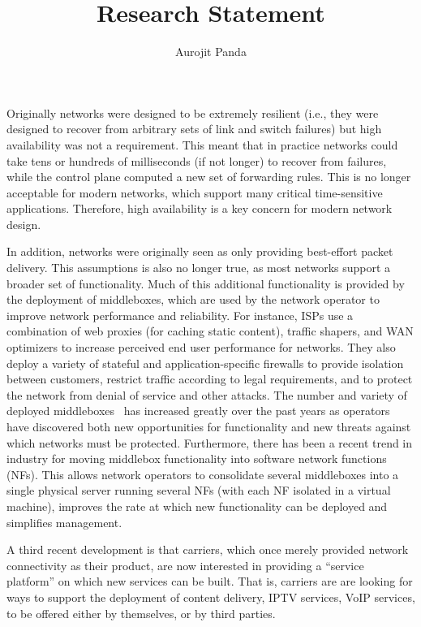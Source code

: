 \documentclass[letterpaper]{article}
\begin{document}
\title{\Large Research Statement}
\author{Aurojit Panda}
\date{}
\thispagestyle{empty}
\maketitle
Originally networks were designed to be extremely resilient (i.e., they were designed to recover from arbitrary sets of
link and switch failures) but high availability was not a requirement. This meant that in practice
networks could take tens or hundreds of milliseconds (if not longer) to recover from failures, while the control plane computed  a new
set of forwarding rules. This is no longer acceptable for modern networks, which support many critical time-sensitive
applications. Therefore, high availability is a key concern for modern network design.

In addition, networks were originally seen as only providing best-effort packet delivery. This assumptions is also no
longer true, as most networks support a broader set of functionality. Much of this additional functionality is provided by the deployment of middleboxes, which are
used by the network operator to improve network performance and reliability. For instance, ISPs use a combination of web
proxies (for caching static content), traffic shapers, and WAN optimizers to increase perceived end user performance for
networks. They also deploy a variety of stateful and application-specific firewalls to provide isolation between
customers, restrict traffic according to legal requirements, and to protect the network from denial of service and other
attacks. The number and variety of deployed middleboxes~\cite{sherry2012making} has increased greatly over the past
years as operators have discovered both new opportunities for functionality and new threats against which networks must be
protected. Furthermore, there has been a recent trend in industry for moving middlebox functionality into software
network functions (NFs). This allows network operators to consolidate several middleboxes into a single physical server
running several NFs (with each NF isolated in a virtual machine), improves the rate at which new functionality can be deployed and simplifies management.

A third recent development is that carriers, which once merely provided network connectivity as their product, are now
interested in providing a ``service platform'' on which new services can be built. That is, carriers are are looking for
ways to support the deployment of content delivery, IPTV services, VoIP services, to be offered either by themselves, or by third parties.
\end{document}
